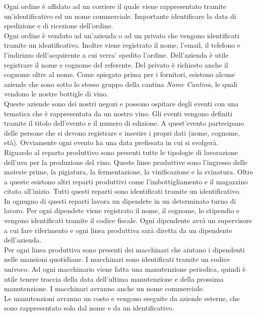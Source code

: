 Ogni ordine è affidato ad un corriere il quale viene rappresentato tramite un'identificativo ed un nome commerciale. Importante identificare la data  di spedizione e di ricezione dell'ordine.\\
Ogni ordine è venduto ad un'azienda o ad un privato che vengono identificati tramite un identificativo. Inoltre viene registrato il nome, l'email, il telefono e l'indirizzo dell'acquirente a cui verra' spedito l'ordine. Dell'azienda è utile registrare il nome e cognome del referente. Del privato è richiesto anche il cognome oltre al nome. Come spiegato prima per i fornitori, esistono alcune aziende che sono sotto lo stesso gruppo della cantina \emph{Nome Cantina}, le quali vendono le nostre bottigle di vino.\\
Queste aziende sono dei nostri negozi e possono ospitare degli eventi con una tematica che è rappresentata da un nostro vino. Gli eventi vengono definiti tramite il titolo dell'evento e il numero di edizione. A quest'evento partecipano delle persone che si devono registrare e inserire i propri dati (nome, cognome, età). Ovviamente ogni evento ha una data prefissata in cui si svolgerà.\\
Riguardo al reparto produttivo sono presenti tutte le tipologie di lavorazione dell'uva per la produzione del vino. Queste linee produttive sono l'ingresso delle materie prime, la pigiatura, la fermentazione, la vinificazione e la svinatura. Oltre a queste esistono altri reparti produttivi come l'imbottigliamento e il magazzino citato all'inizio. Tutti questi reparti sono identificati tramite un identificativo.\\
In ognugno di questi reparti lavora un dipendete in un determinato turno di lavoro. Per ogni dipendete viene registrato il nome, il cognome, lo stipendio e vengono identificati tramite il codice fiscale. Ogni dipendente avrà un supervisore a cui fare riferimento e ogni linea produttiva sarà diretta da un dipendente dell'azienda.\\
Per ogni linea produttiva sono presenti dei macchinari che aiutano i dipendenti nelle mansioni quotidiane. I macchinari sono identificati tramite un codice univoco. Ad ogni macchinario viene fatta una manutenzione periodica, quindi è utile tenere traccia della data dell'ultima manutenzione e della prossima manutenzione. I macchinari avranno anche un nome commerciale.\\
Le manutenzioni avranno un costo e vengono eseguite da aziende esterne, che sono rappresentato solo dal nome e da un identificativo.